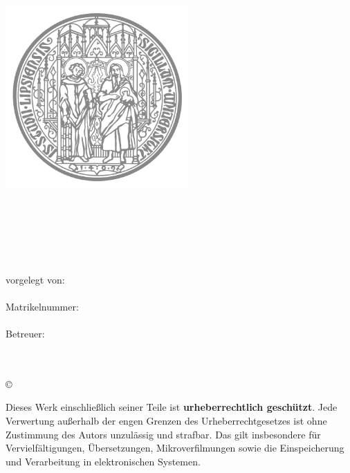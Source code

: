 \thispagestyle{plain}
\begin{titlepage}

\begin{center}
\includegraphics[height=7cm]{Bilder/Uni-L.png}\\[2.5ex]

\textsc{\hochschule}\\[1.2ex]
\institut\\
\fakultaet\\
\fachgebiet\\[6ex]

\textbf{\large\titel}\\[1.5ex]
\art\\[6ex]

\normalsize
vorgelegt von:\\
\autor\\[1.5ex]
Matrikelnummer:\\
\matrikelnr\\[1.5ex]
Betreuer:\\
\erstgutachter\\
\zweitgutachter\\[1.0ex]
\end{center}


\begin{center}
\copyright\ \jahr\\[1.0ex]
\end{center}

\singlespacing
\small
\noindent Dieses Werk einschließlich seiner Teile ist \textbf{urheberrechtlich geschützt}. Jede Verwertung außerhalb der engen Grenzen des Urheberrechtgesetzes ist ohne Zustimmung des Autors unzulässig und strafbar. Das gilt insbesondere für Vervielfältigungen, Übersetzungen, Mikroverfilmungen sowie die Einspeicherung und Verarbeitung in elektronischen Systemen.

\end{titlepage}
